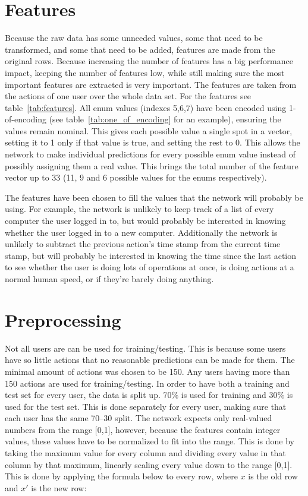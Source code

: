 \section{Features}
Because the raw data has some unneeded values, some that need to be transformed, and some that need to be added, features are made from the original rows. Because increasing the number of features has a big performance impact, keeping the number of features low, while still making sure the most important features are extracted is very important. The features are taken from the actions of one user over the whole data set. For the features see table~\ref{tab:features}. All enum values (indexes 5,6,7) have been encoded using 1-of-encoding (see table~\ref{tab:one_of_encoding} for an example), ensuring the values remain nominal. This gives each possible value a single spot in a vector, setting it to 1 only if that value is true, and setting the rest to 0. This allows the network to make individual predictions for every possible enum value instead of possibly assigning them a real value. This brings the total number of the feature vector up to 33 (11, 9 and 6 possible values for the enums respectively).

The features have been chosen to fill the values that the network will probably be using. For example, the network is unlikely to keep track of a list of every computer the user logged in to, but would probably be interested in knowing whether the user logged in to a new computer. Additionally the network is unlikely to subtract the previous action's time stamp from the current time stamp, but will probably be interested in knowing the time since the last action to see whether the user is doing lots of operations at once, is doing actions at a normal human speed, or if they're barely doing anything.

\section{Preprocessing}
Not all users are can be used for training/testing. This is because some users have so little actions that no reasonable predictions can be made for them. The minimal amount of actions was chosen to be 150. Any users having more than 150 actions are used for training/testing. In order to have both a training and test set for every user, the data is split up. 70\% is used for training and 30\% is used for the test set. This is done separately for every user, making sure that each user has the same 70--30 split. The network expects only real-valued numbers from the range [0,1], however, because the features contain integer values, these values have to be normalized to fit into the range. This is done by taking the maximum value for every column and dividing every value in that column by that maximum, linearly scaling every value down to the range [0,1]. This is done by applying the formula below to every row, where \(x\) is the old row and \(x'\) is the new row:

